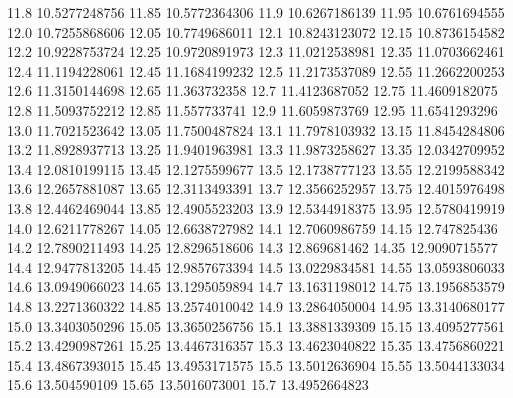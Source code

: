            11.8    10.5277248756
          11.85    10.5772364306
           11.9    10.6267186139
          11.95    10.6761694555
           12.0    10.7255868606
          12.05    10.7749686011
           12.1    10.8243123072
          12.15    10.8736154582
           12.2    10.9228753724
          12.25    10.9720891973
           12.3    11.0212538981
          12.35    11.0703662461
           12.4    11.1194228061
          12.45    11.1684199232
           12.5    11.2173537089
          12.55    11.2662200253
           12.6    11.3150144698
          12.65     11.363732358
           12.7    11.4123687052
          12.75    11.4609182075
           12.8    11.5093752212
          12.85     11.557733741
           12.9    11.6059873769
          12.95    11.6541293296
           13.0    11.7021523642
          13.05    11.7500487824
           13.1    11.7978103932
          13.15    11.8454284806
           13.2    11.8928937713
          13.25    11.9401963981
           13.3    11.9873258627
          13.35    12.0342709952
           13.4    12.0810199115
          13.45    12.1275599677
           13.5    12.1738777123
          13.55    12.2199588342
           13.6    12.2657881087
          13.65    12.3113493391
           13.7    12.3566252957
          13.75    12.4015976498
           13.8    12.4462469044
          13.85    12.4905523203
           13.9    12.5344918375
          13.95    12.5780419919
           14.0    12.6211778267
          14.05    12.6638727982
           14.1    12.7060986759
          14.15     12.747825436
           14.2    12.7890211493
          14.25    12.8296518606
           14.3     12.869681462
          14.35    12.9090715577
           14.4    12.9477813205
          14.45    12.9857673394
           14.5    13.0229834581
          14.55    13.0593806033
           14.6    13.0949066023
          14.65    13.1295059894
           14.7    13.1631198012
          14.75    13.1956853579
           14.8    13.2271360322
          14.85    13.2574010042
           14.9    13.2864050004
          14.95    13.3140680177
           15.0    13.3403050296
          15.05    13.3650256756
           15.1    13.3881339309
          15.15    13.4095277561
           15.2    13.4290987261
          15.25    13.4467316357
           15.3    13.4623040822
          15.35    13.4756860221
           15.4    13.4867393015
          15.45    13.4953171575
           15.5    13.5012636904
          15.55    13.5044133034
           15.6     13.504590109
          15.65    13.5016073001
           15.7    13.4952664823
